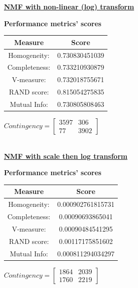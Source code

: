 \documentclass{report}
\begin{document}
\underline{\textbf{NMF with non-linear (log) transform}} \\

\begin{center}
	\textbf{Performance metrics' scores} \\ \vspace{10pt}
	\begin{tabular}{*{2}{c}}
		\toprule
		\textbf{Measure} & \textbf{Score} \\
		\midrule
		Homogeneity: 		& 0.730830451039 \\
		\midrule
		Completeness: 		& 0.733210930879 \\
		\midrule
		V-measure: 			& 0.732018755671 \\
		\midrule
		RAND score: 		& 0.815054275835 \\
		\midrule
		Mutual Info: 		& 0.730805808463 \\
		\bottomrule
	\end{tabular}
	\qquad
	$Contingency = \left[\begin{array}{*{2}{c}}
			3597  & 306 \\
			77 	& 3902 
				\end{array}\right]
			$
\end{center}
\\


\underline{\textbf{NMF with scale then log transform}} \\

\begin{center}
	\textbf{Performance metrics' scores} \\ \vspace{10pt}
	\begin{tabular}{*{2}{c}}
		\toprule
		\textbf{Measure} & \textbf{Score} \\
		\midrule
		Homogeneity: & 0.000902761815731 \\
		\midrule
		Completeness: & 0.00090693865041 \\
		\midrule
		V-measure: 	& 0.00090484541295  \\
		\midrule
		RAND score: & 0.00117175851602  \\
		\midrule
		Mutual Info: & 0.000811294034297  \\
		\bottomrule
	\end{tabular}
	\qquad
	$Contingency = \left[\begin{array}{*{2}{c}}
			1864 & 2039\\
			1760 & 2219 
				\end{array}\right]
			$
\end{center}
\end{document}
